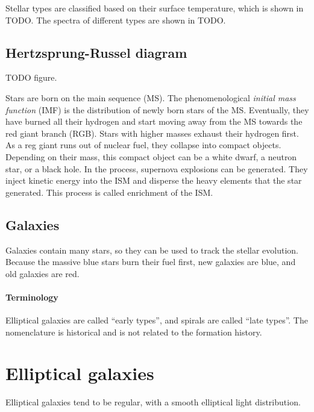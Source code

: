 Stellar types are classified based on their surface temperature, which is shown in TODO.
The spectra of different types are shown in TODO.

\subsection{Hertzsprung-Russel diagram}

TODO figure.

Stars are born on the main sequence (MS).
The phenomenological \emph{initial mass function} (IMF) is the distribution of newly born stars of the MS.
Eventually, they have burned all their hydrogen and start moving away from the MS towards the red giant branch (RGB).
Stars with higher masses exhaust their hydrogen first.
As a reg giant runs out of nuclear fuel, they collapse into compact objects. Depending on their mass, this compact object can be a white dwarf, a neutron star, or a black hole.
In the process, supernova explosions can be generated.
They inject kinetic energy into the ISM and disperse the heavy elements that the star generated.
This process is called enrichment of the ISM.

\subsection{Galaxies}
Galaxies contain many stars, so they can be used to track the stellar evolution.
Because the massive blue stars burn their fuel first, new galaxies are blue, and old galaxies are red.





%
%



\paragraph{Terminology}
Elliptical galaxies are called \enquote{early types}, and spirals are called \enquote{late types}.
The nomenclature is historical and is not related to the formation history.



\section{Elliptical galaxies}
Elliptical galaxies tend to be regular, with a smooth elliptical light distribution.

